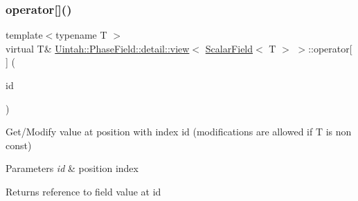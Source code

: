 \subsubsection{\texorpdfstring{operator[]()}{operator[]()}\hspace{0.1cm}{\footnotesize\ttfamily [1/2]}}
{\footnotesize\ttfamily template$<$typename T $>$ \\
virtual T\& \hyperlink{classUintah_1_1PhaseField_1_1detail_1_1view}{Uintah\+::\+Phase\+Field\+::detail\+::view}$<$ \hyperlink{structUintah_1_1PhaseField_1_1ScalarField}{Scalar\+Field}$<$ T $>$ $>$\+::operator\mbox{[}$\,$\mbox{]} (\begin{DoxyParamCaption}\item[{const Int\+Vector \&}]{id }\end{DoxyParamCaption})\hspace{0.3cm}{\ttfamily [pure virtual]}}



Get/\+Modify value at position with index id (modifications are allowed if T is non const) 


\begin{DoxyParams}{Parameters}
{\em id} & position index \\
\hline
\end{DoxyParams}
\begin{DoxyReturn}{Returns}
reference to field value at id 
\end{DoxyReturn}


